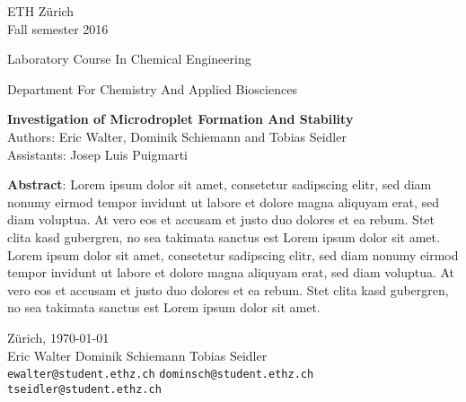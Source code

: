 \documentclass[10pt]{article}
\begin{document}
\setlength{\parindent}{0pt}


\begin{titlepage}

	\thispagestyle{empty}
	
	
	\noindent ETH Z\"urich \\
	\noindent Fall semester 2016 \\[2cm]

	\begin{center}
	{\LARGE  Laboratory Course In Chemical Engineering  }\\
	\end{center}
	\begin{center}
	{\large Department For Chemistry And Applied Biosciences     }\\[1 cm]
	\end{center}
	
		\begin{center}
		\begingroup
	{\LARGE \textbf{Investigation of Microdroplet Formation And Stability  }} \\
	Authors: Eric Walter, Dominik Schiemann and Tobias Seidler \\
	\noindent Assistants: Josep Luis Puigmarti \\
	\endgroup
	\end{center}

\hspace{3cm}

	

	
	\noindent \textbf{Abstract}:    Lorem ipsum dolor sit amet, consetetur sadipscing elitr, sed diam nonumy eirmod tempor invidunt ut labore et dolore magna aliquyam erat, sed diam voluptua. At vero eos et accusam et justo duo dolores et ea rebum. Stet clita kasd gubergren, no sea takimata sanctus est Lorem ipsum dolor sit amet. Lorem ipsum dolor sit amet, consetetur sadipscing elitr, sed diam nonumy eirmod tempor invidunt ut labore et dolore magna aliquyam erat, sed diam voluptua. At vero eos et accusam et justo duo dolores et ea rebum. Stet clita kasd gubergren, no sea takimata sanctus est Lorem ipsum dolor sit amet.   \\
	
	\vfill
	
	\noindent Z\"urich, \today  \\[2cm]
Eric Walter \hfill Dominik Schiemann \hfill Tobias Seidler\\
\texttt{ewalter@student.ethz.ch} \hfill \texttt{dominsch@student.ethz.ch} \hfill \texttt{tseidler@student.ethz.ch}

	

	
	
	
\end{titlepage}
\end{document}
